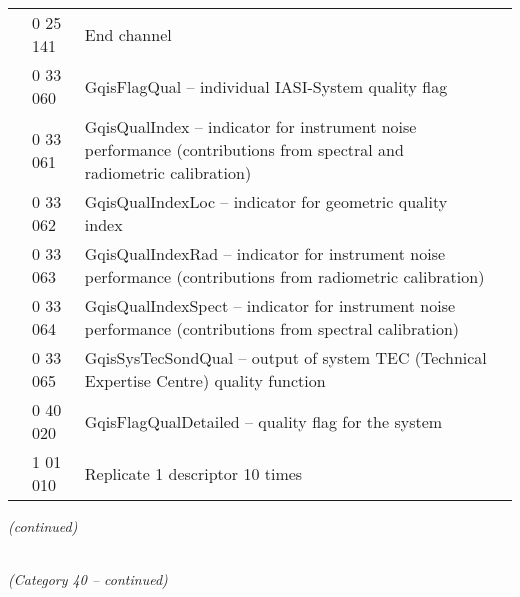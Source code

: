 \begin{longtable}[]{@{}llll@{}}
& 0 25 141 & End channel &\tabularnewline
& 0 33 060 & GqisFlagQual -- individual IASI-System quality flag &\tabularnewline
& 0 33 061 & GqisQualIndex -- indicator for instrument noise performance (contributions from spectral and radiometric calibration) &\tabularnewline
& 0 33 062 & GqisQualIndexLoc -- indicator for geometric quality index &\tabularnewline
& 0 33 063 & GqisQualIndexRad -- indicator for instrument noise performance (contributions from radiometric calibration) &\tabularnewline
& 0 33 064 & GqisQualIndexSpect -- indicator for instrument noise performance (contributions from spectral calibration) &\tabularnewline
& 0 33 065 & GqisSysTecSondQual -- output of system TEC (Technical Expertise Centre) quality function &\tabularnewline
& 0 40 020 & GqisFlagQualDetailed -- quality flag for the system &\tabularnewline
& 1 01 010 & Replicate 1 descriptor 10 times &\tabularnewline
\bottomrule
\end{longtable}

\emph{(continued)}

\emph{\\
(Category 40 -- continued)}

